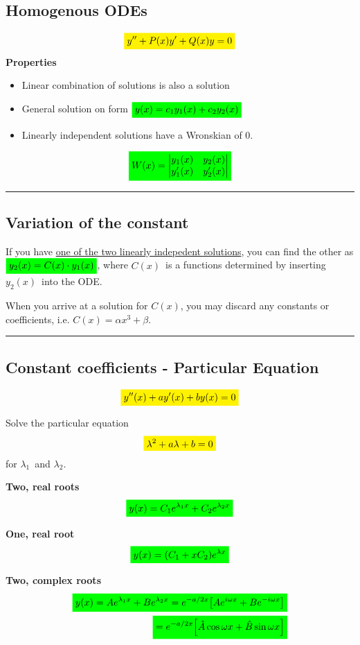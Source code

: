 \documentclass[10pt,a4paper]{article}
\renewcommand{\exp}{e^}
\newcommand{\holine}[1][\medskipamount]{\par\vspace*{\dimexpr-\parskip-\baselineskip+#1}\noindent\rule{\linewidth}{1pt}\par\vspace*{\dimexpr-\parskip-.5\baselineskip+#1}}
\newcommand{\yl}[1]{\colorbox{yellow}{$\displaystyle #1$}}
\newcommand{\gr}[1]{\colorbox{green}{$\displaystyle #1$}}
\begin{document}
\begin{multicols}{2}
\section*{Homogenous ODEs}
\[\yl{
    y'' + P(x)y' + Q(x)y = 0
}\]
\textbf{Properties}
\begin{itemize}
    \item Linear combination of solutions is also a solution
    \item General solution on form $\gr{y(x) = c_1 y_1(x) + c_2 y_2(x)}$
    \item Linearly independent solutions have a Wronskian of 0.
\end{itemize}
\[\gr{
    W(x) = 
    \begin{vmatrix} y_1(x) & y_2(x) \\ y_1'(x) & y_2'(x) \end{vmatrix}
}\]


\holine
\subsection*{Variation of the constant}
If you have \underline{one of the two linearly indepedent solutions}, you can find the other as $\gr{y_2(x) = C(x)\cdot y_1(x)}$, where $C(x)$ is a functions determined by inserting $y_2(x)$ into the ODE.

When you arrive at a solution for $C(x)$, you may discard any constants or coefficients, i.e. $C(x) = \alpha x^3 + \beta$.


\holine
\subsection*{Constant coefficients - Particular Equation}
\[\yl{
    y''(x) + ay'(x) + by(x) = 0
}\]

Solve the particular equation
\[\yl{
    \lambda^2 + a\lambda + b = 0
}\]
for $\lambda_1$ and $\lambda_2$.


\textbf{Two, real roots}
\[\gr{
    y(x) = C_1\exp{\lambda_1 x} + C_2\exp{\lambda_2 x}
}\]


\textbf{One, real root}
\[\gr{
    y(x) = (C_1 + xC_2)\exp{\lambda x}
}\]


\textbf{Two, complex roots}
\begin{equation*}
\begin{split}\gr{
    y(x) = A\exp{\lambda_1 x} + B\exp{\lambda_2 x} = \exp{-a/2 x}\qty[A\exp{i\omega x} + B\exp{-i\omega x}]} \\
    \gr{=\exp{-a/2 x}\qty[\hat{A}\cos{\omega x} + \hat{B}\sin{\omega x}]}
\end{split}
\end{equation*}



\end{multicols}
\end{document}
